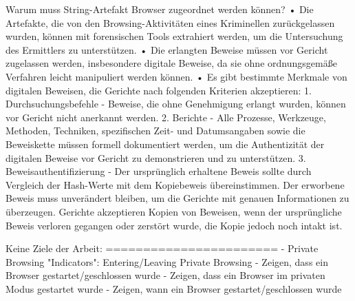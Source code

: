 Warum muss String-Artefakt Browser zugeordnet werden können? \cite{Izzati.2022}
	•	Die Artefakte, die von den Browsing-Aktivitäten eines Kriminellen zurückgelassen wurden, können mit forensischen Tools extrahiert werden, um die Untersuchung des Ermittlers zu unterstützen.
	•	Die erlangten Beweise müssen vor Gericht zugelassen werden, insbesondere digitale Beweise, da sie ohne ordnungsgemäße Verfahren leicht manipuliert werden können.
	•	Es gibt bestimmte Merkmale von digitalen Beweisen, die Gerichte nach folgenden Kriterien akzeptieren:
	1.	Durchsuchungsbefehle - Beweise, die ohne Genehmigung erlangt wurden, können vor Gericht nicht anerkannt werden.
	2.	Berichte - Alle Prozesse, Werkzeuge, Methoden, Techniken, spezifischen Zeit- und Datumsangaben sowie die Beweiskette müssen formell dokumentiert werden, um die Authentizität der digitalen Beweise vor Gericht zu demonstrieren und zu unterstützen.
	3.	Beweisauthentifizierung - Der ursprünglich erhaltene Beweis sollte durch Vergleich der Hash-Werte mit dem Kopiebeweis übereinstimmen. Der erworbene Beweis muss unverändert bleiben, um die Gerichte mit genauen Informationen zu überzeugen. Gerichte akzeptieren Kopien von Beweisen, wenn der ursprüngliche Beweis verloren gegangen oder zerstört wurde, die Kopie jedoch noch intakt ist.
	

Keine Ziele der Arbeit:
=======================
- 	Private Browsing "Indicators": Entering/Leaving Private Browsing \cite{Ohana.2013}
-	Zeigen, dass ein Browser gestartet/geschlossen wurde
-	Zeigen, dass ein Browser im privaten Modus gestartet wurde
-	Zeigen, wann ein Browser gestartet/geschlossen wurde




